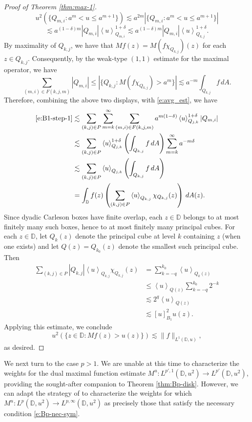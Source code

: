 \documentclass{amsart}
\newcommand{\avg}[1]{\left\langle {#1}\right\rangle}
\theoremstyle{definition}
\numberwithin{equation}{section}
\begin{document}
\begin{proof}[Proof of Theorem \ref{thm:max-1}]
    \[ u^2(\{Q_{m,i} \colon a^m < u \le a^{m+1}\})\lesssim a^{2m}|\{Q_{m,i} \colon a^m < u \le a^{m+1}\}| \] 
    \[ \lesssim a^{(1-\delta)m}|Q_{m,i}|\avg{u}_{Q_{m,i}}^{1+\delta} \lesssim a^{(1-\delta)m}|Q_{m,i}|\avg{u}_{Q_{k,j}}^{1+\delta} .
    \]
    By maximality of $Q_{k,j}$, we have that $Mf(z) = M(f\chi_{Q_{k,j}})(z)$ for each $z \in Q_{k,j}$. Consequently, by the weak-type $(1,1)$ estimate for the maximal operator, we have 
    \[
        \sum_{(m,i) \in F(k,j,m)}|Q_{m,i}| \le |\{ Q_{k,j} \colon M(f\chi_{Q_{k,j}}) > a^m \}| \lesssim a^{-m}\int_{Q_{k,j}}f\,dA.
    \]
   Therefore, combining the above two displays,
    with \eqref{e:avg_est}, we have
    \begin{align*}
        \eqref{e:B1-step-1}
        &\lesssim \sum_{(k,j) \in P}\sum_{m=k}^\infty \sum_{(m,i) \in F(k,j,m)} a^{m(1-\delta)}\avg{u}_{Q_{j,k}}^{1 + \delta}|Q_{m,i}| \\
        &\lesssim \sum_{(k,j) \in P} \avg{u}_{Q_{j,k}}^{1 + \delta}\left(\int_{Q_{k,j}}f\,dA\right)\sum_{m=k}^\infty a^{-m\delta}\\
        &\lesssim \sum_{(k,j) \in P} \avg{u}_{Q_{j,k}} \left(\int_{Q_{k,j}}f\,dA\right)\\   
        &= \int_{\mathbb{D}}f(z)\left(\sum_{(k,j) \in P}\avg{u}_{Q_{k,j}}\chi_{Q_{k,j}}(z)\right)\,dA(z).
    \end{align*}
    Since dyadic Carleson boxes have finite overlap, each $z \in \mathbb{D}$ belongs to at most finitely many such boxes, hence to at most finitely many principal cubes. For each $z \in \mathbb{D}$, let $Q_k(z)$ denote the principal cube at level $k$ containing $z$ (when one exists) and let $Q(z) = Q_{k_0}(z)$ denote the smallest such principal cube. Then
    \begin{align*}
        \sum_{(k,j) \in P}{|Q_{k,j}|}\avg{u}_{Q_{k,j}}\chi_{Q_{k,j}}(z) 
        &= \sum_{k = -q}^{k_0}\avg{u}_{Q_k(z)}\\
        &\le \avg{u}_{Q(z)}\sum_{k = -q}^{k_0}2^{-k}\\
        &\lesssim 2^q\avg{u}_{Q(z)} \\
        &\lesssim [u]_{B_1}^2u(z).
    \end{align*}
    Applying this estimate, we conclude
    \[
        u^2(\{z \in \mathbb{D} \colon Mf(z) > u(z) \}) \lesssim \|f\|_{L^1(\mathbb{D},u)},
    \]
    as desired.
\end{proof}

We next turn to the case $p>1$. We are unable at this time to characterize the weights for the dual maximal function estimate $M^u \colon L^{p',1}(\mathbb{D},u^2) \to L^{p'}(\mathbb{D},u^2)$, providing the sought-after companion to Theorem \ref{thm:Bp-disk}. 
However, we can adapt the strategy of \cite{Swe25} to characterize the weights for which $M^u\colon L^p(\mathbb{D},u^2) \to L^{p,\infty}(\mathbb{D},u^2)$ as precisely those that satisfy the necessary condition \eqref{e:Bp-nec-sym}.
\end{document}
